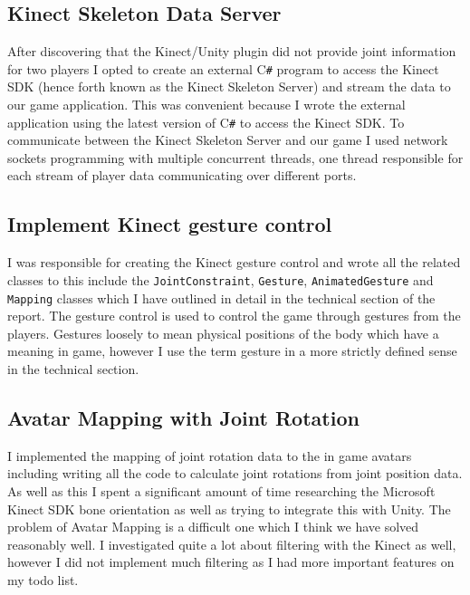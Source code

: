 \documentclass[a4paper,oneside]{memoir}
\begin{document}
			\subsection{Kinect Skeleton Data Server}

				After discovering that the Kinect/Unity plugin did not provide joint information for two players I opted to create an external C\texttt{\#} program to access the Kinect SDK (hence forth known as the Kinect Skeleton Server) and stream the data to our game application. This was convenient because I wrote the external application using the latest version of C\texttt{\#} to access the Kinect SDK. To communicate between the Kinect Skeleton Server and our game I used network sockets programming with multiple concurrent threads, one thread responsible for each stream of player data communicating over different ports.

			\subsection{Implement Kinect gesture control}

				I was responsible for creating the Kinect gesture control and wrote all the related classes to this include the \texttt{JointConstraint}, \texttt{Gesture}, \texttt{AnimatedGesture} and \texttt{Mapping} classes which I have outlined in detail in the technical section of the report. The gesture control is used to control the game through gestures from the players. Gestures loosely to mean physical positions of the body which have a meaning in game, however I use the term gesture in a more strictly defined sense in the technical section.

			\subsection{Avatar Mapping with Joint Rotation}

				I implemented the mapping of joint rotation data to the in game avatars including writing all the code to calculate joint rotations from joint position data.
				As well as this I spent a significant amount of time researching the Microsoft Kinect SDK bone orientation as well as trying to integrate this with Unity.
				The problem of Avatar Mapping is a difficult one which I think we have solved reasonably well.
				I investigated quite a lot about filtering with the Kinect as well, however I did not implement much filtering as I had more important features on my todo list.
\end{document}
